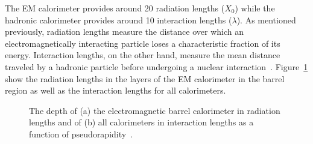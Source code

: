 The \ac{EM} calorimeter provides around 20 radiation lengths ($X_0$) while the had\-ronic calorimeter provides around 10 interaction lengths ($\lambda$). 
As mentioned previously, radiation lengths measure the distance over which an electromagnetically interacting particle loses a characteristic fraction of its energy.
Interaction lengths, on the other hand, measure the mean distance traveled by a hadronic particle before undergoing a nuclear interaction~\cite{pdg}.
Figure~\ref{fig:calo_interactionlengths} show the radiation lengths in the layers of the \ac{EM} calorimeter in the barrel region as well as the interaction lengths for all calorimeters.


\begin{figure}[hbtp]
\caption{The depth of (a) the electromagnetic barrel calorimeter in radiation lengths and of (b) all calorimeters in interaction lengths as a function of pseudorapidity~\cite{atlas_experiment}.}
\label{fig:calo_interactionlengths}
\end{figure}

